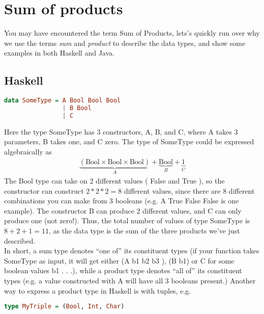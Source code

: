     \newpage
    \section{Sum of products}
        You may have encountered the term \gls{Sum of Products}, lets's quickly run over why we use the terms \textit{sum} and \textit{product} 
        to describe the data types, and show some examples in both Haskell and Java.

        \subsection*{Haskell}
            \begin{lstlisting}[language=Haskell]
data SomeType = A Bool Bool Bool
                | B Bool
                | C
            \end{lstlisting}
            Here the type SomeType has 3 constructors, A, B, and C, where A takes 3 parameters, B takes one, and C zero. 
            The type of SomeType could be expressed algebraically as
            \begin{align*}
                \underbrace{(\text{Bool} \times \text{Bool} \times \text{Bool})}_{A} + \underbrace{\text{Bool}}_{B} + \underbrace{1}_{C}
            \end{align*}
            The Bool type can take on 2 different values
            ( False and True ), so the constructor
            can construct $2 * 2 * 2 = 8$ different values, since there are 8 different combinations you can
            make from 3 booleans (e.g. A True False False is one example). The constructor B can
            produce 2 different values, and C can only produce one (not zero!).
            Thus, the total number of values of type SomeType is $8 + 2 + 1 = 11$, as the data type
            is the sum of the three products we've just described.\\
            In short, a sum type denotes “one of” its constituent types (if your function takes SomeType
            as input, it will get either (A b1 b2 b3 ), (B b1) or C for some boolean values b1 . . .), while
            a product type denotes “all of” its constituent types (e.g. a value constructed with A will
            have all 3 booleans present.) Another way to express a product type in Haskell is with tuples,
            e.g.
            \begin{lstlisting}[language=Haskell]
type MyTriple = (Bool, Int, Char)
            \end{lstlisting}

